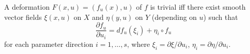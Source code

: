 A deformation $F(x, u) = (f_u(x), u)$ of $f$ is trivial iff there exist smooth vector fields $\xi(x, u)$ on $X$ and $\eta(y, u)$ on $Y$ (depending on $u$) such that
$$\frac{\partial f_u}{\partial u_i} = df_u(\xi_i) + \eta_i \circ f_u$$
for each parameter direction $i = 1, \ldots, s$, where $\xi_i = \partial \xi/\partial u_i$, $\eta_i = \partial \eta/\partial u_i$.
